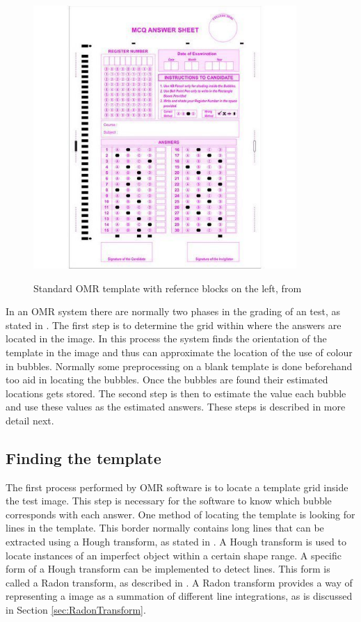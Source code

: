 \begin{figure}
  \centering
  \includegraphics[width=10cm]{omrTemplate}\\
  \caption{Standard OMR template with refernce blocks on the left, from \citet{stdTemplate}}
  \label{fig:omrTemplate}
\end{figure}

In an OMR system there are normally two phases in the grading of an test, as stated in \citet{DraganI2003}. The first step is to determine the grid within where the answers are located in the image. In this process the system finds the orientation of the template in the image and thus can approximate the location of the use of colour in bubbles. Normally some preprocessing on a blank template is done beforehand too aid in locating the bubbles. Once the bubbles are found their estimated locations gets stored. The second step is then to estimate the value each bubble and use these values as the estimated answers. These steps is described in more detail next.

\subsection{Finding the template}

The first process performed by OMR software is to locate a template grid inside the test image. This step is necessary for the software to know which bubble corresponds with each answer. One method of locating the template is looking for lines in the template. This border normally contains long lines that can be extracted using a Hough transform, as stated in \citet{MVGI2015}. A Hough transform is used to locate instances of an imperfect object within a certain shape range. A specific form of a Hough transform can be implemented to detect lines. This form is called a Radon transform, as described in \citet{MathWorks}. A Radon transform provides a way of representing a image as a summation of different line integrations, as is discussed in Section \ref{sec:RadonTransform}. 

